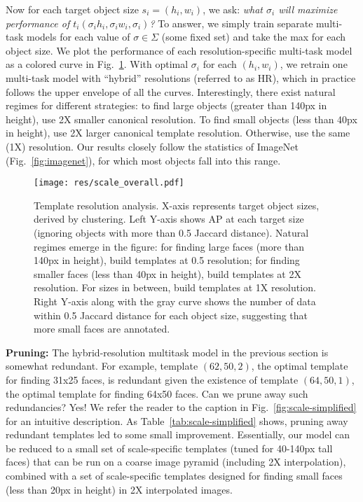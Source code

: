 \documentclass[10pt,twocolumn,letterpaper]{article}
\begin{document}
Now for each target object size $s_i=(h_i, w_i)$, we ask:
{\it what $\sigma_i$ will maximize performance of
  $t_i(\sigma_i h_i, \sigma_i w_i, \sigma_i)$?} To answer, we simply train separate multi-task models for each value of $\sigma \in \Sigma $ (some fixed set) and take the max for each object size. We plot the performance of each resolution-specific multi-task model as a colored curve in Fig.~\ref{fig:scale-overall}. With optimal $\sigma_i$ for each $(h_i, w_i)$, we retrain one multi-task model with ``hybrid'' resolutions (referred to as HR), which in practice follows the upper envelope of all the curves. Interestingly, there exist natural regimes for different strategies: to find large objects (greater than 140px in height),  use 2X smaller canonical resolution. To find small objects (less than 40px in height), use 2X larger canonical template resolution. Otherwise, use the same (1X) resolution. Our results closely follow the statistics of ImageNet (Fig.~\ref{fig:imagenet}), for which most objects fall into this range.


\begin{figure}[t]
  \centering
  \texttt{[image: res/scale\_overall.pdf]}
  \caption{Template resolution analysis. X-axis represents target object sizes, derived by clustering. Left Y-axis shows AP at each target size (ignoring objects with more than 0.5 Jaccard distance). Natural regimes emerge in the figure: for finding large faces (more than 140px in height), build templates at 0.5 resolution; for finding smaller faces (less than 40px in height), build templates at 2X resolution. For sizes in between, build templates at 1X resolution. Right Y-axis along with the gray curve shows the number of data within 0.5 Jaccard distance for each object size, suggesting that more small faces are annotated. }
\label{fig:scale-overall}
\end{figure}










{\bf Pruning:} The hybrid-resolution multitask model in the previous section is somewhat redundant. For example, template $(62,50,2)$, the optimal template for finding 31x25 faces, is redundant given the existence of template $(64,50,1)$, the optimal template for finding 64x50 faces.
Can we prune away such redundancies? Yes! We refer the reader to the caption in Fig.~\ref{fig:scale-simplified} for an intuitive description. As Table~\ref{tab:scale-simplified} shows, pruning away redundant templates led to some small improvement. Essentially, our model can be reduced to a small set of scale-specific templates (tuned for 40-140px tall faces) that can be run on a coarse image pyramid (including 2X interpolation), combined with a set of scale-specific templates designed for finding small faces (less than 20px in height) in 2X interpolated images.
\end{document}
